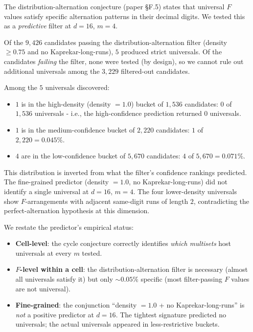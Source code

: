 \documentclass[11pt,letterpaper]{article}
\providecommand{\tightlist}{%
  \setlength{\itemsep}{0pt}\setlength{\parskip}{0pt}}
\theoremstyle{paperstyle}
\theoremstyle{paperstyledef}
\theoremstyle{paperstylerem}
\begin{document}
The distribution-alternation conjecture (paper §F.5) states that
universal \(F\) values satisfy specific alternation patterns in their
decimal digits. We tested this as a \emph{predictive} filter at
\(d = 16\), \(m = 4\).

Of the \(9{,}426\) candidates passing the distribution-alternation
filter (density \(\geq 0.75\) and no Kaprekar-long-runs), \(5\) produced
strict universals. Of the candidates \emph{failing} the filter, none
were tested (by design), so we cannot rule out additional universals
among the \(3{,}229\) filtered-out candidates.

Among the \(5\) universals discovered:

\begin{itemize}
\tightlist
\item
  \(1\) is in the high-density (density \(= 1.0\)) bucket of \(1{,}536\)
  candidates: \(0\) of \(1{,}536\) universals - i.e., the
  high-confidence prediction returned \(0\) universals.
\item
  \(1\) is in the medium-confidence bucket of \(2{,}220\) candidates:
  \(1\) of \(2{,}220 = 0.045\%\).
\item
  \(4\) are in the low-confidence bucket of \(5{,}670\) candidates:
  \(4\) of \(5{,}670 = 0.071\%\).
\end{itemize}

This distribution is inverted from what the filter's confidence rankings
predicted. The fine-grained predictor (density \(= 1.0\), no
Kaprekar-long-runs) did not identify a single universal at \(d = 16\),
\(m = 4\). The four lower-density universals show \(F\)-arrangements
with adjacent same-digit runs of length \(2\), contradicting the
perfect-alternation hypothesis at this dimension.

We restate the predictor's empirical status:

\begin{itemize}
\tightlist
\item
  \textbf{Cell-level}: the cycle conjecture correctly identifies
  \emph{which multisets} host universals at every \(m\) tested.
\item
  \textbf{\(F\)-level within a cell}: the distribution-alternation
  filter is necessary (almost all universals satisfy it) but only
  \(\sim 0.05\%\) specific (most filter-passing \(F\) values are not
  universal).
\item
  \textbf{Fine-grained}: the conjunction ``density \(= 1.0\) + no
  Kaprekar-long-runs'' is \emph{not} a positive predictor at \(d = 16\).
  The tightest signature predicted no universals; the actual universals
  appeared in less-restrictive buckets.
\end{itemize}
\end{document}
